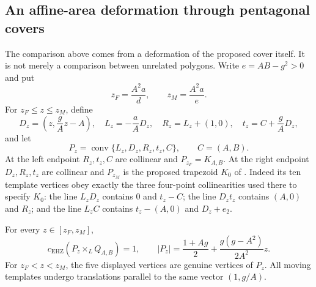 \subsection{An affine-area deformation through pentagonal covers}

The comparison above comes from a deformation of the proposed cover itself.
It is not merely a comparison between unrelated polygons. Write
$e=AB-g^2>0$ and put
\[
 z_F=\frac{A^2a}{d},\qquad z_M=\frac{A^2a}{e}.
\]
For $z_F\leq z\leq z_M$, define
\[
 D_z=\left(z,\frac gA z-A\right),\quad
 L_z=-\frac aA D_z,\quad R_z=L_z+(1,0),\quad
 t_z=C+\frac gA D_z,
\]
and let
\[
 P_z=\operatorname{conv}\{L_z,D_z,R_z,t_z,C\},\qquad C=(A,B).
\]
At the left endpoint $R_z,t_z,C$ are collinear and $P_{z_F}=K_{A,B}$.
At the right endpoint $D_z,R_z,t_z$ are collinear and $P_{z_M}$ is the
proposed trapezoid $K_0$ of \cite[Figure~11]{BMP2026}.
Indeed its ten template vertices obey exactly the three four-point
collinearities used there to specify $K_0$: the line $L_zD_z$ contains
$0$ and $t_z-C$; the line $D_zt_z$ contains $(A,0)$ and $R_z$;
and the line $L_zC$ contains $t_z-(A,0)$ and $D_z+e_2$.

\begin{proposition}\label{prop:truncated-shadow}
For every $z\in[z_F,z_M]$,
\begin{equation}\label{eq:shadow-cover-area}
 c_{\mathrm{EHZ}}(P_z\times_L Q_{A,B})=1,\qquad
 |P_z|=\frac{1+Ag}{2}+\frac{g(g-A^2)}{2A^2}z.
\end{equation}
For $z_F<z<z_M$, the five displayed vertices are genuine vertices of
$P_z$. All moving templates undergo translations parallel to the same
vector $(1,g/A)$.
\end{proposition}

